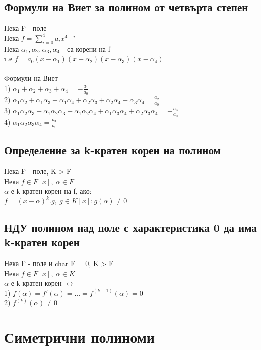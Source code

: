 \documentclass[12pt]{article}
\begin{document}
\subsection{Формули на Виет за полином от четвърта степен}
Нека F - поле \\
Нека $f = \sum\limits_{i=0}^{4}a_ix^{4-i}$ \\
Нека $\alpha_1 , \alpha_2 , \alpha_3 , \alpha_4$ - са корени на f \\
т.е $f = a_0(x-\alpha_1)(x-\alpha_2)(x-\alpha_3)(x-\alpha_4)$ \\\\
Формули на Виет\\
1) $\alpha_1 + \alpha_2 + \alpha_3 + \alpha_4 = -\frac{a_1}{a_0}$ \\
2) $\alpha_1\alpha_2 + \alpha_1\alpha_3 + \alpha_1\alpha_4 + \alpha_2\alpha_3 + \alpha_2\alpha_4 + \alpha_3\alpha_4 = \frac{a_2}{a_0}$\\
3) $\alpha_1\alpha_2\alpha_3 + \alpha_1\alpha_2\alpha_3 + \alpha_1\alpha_2\alpha_4 + \alpha_1\alpha_3\alpha_4 + \alpha_2\alpha_3\alpha_4 = -\frac{a_3}{a_0}$\\
4) $\alpha_1\alpha_2\alpha_3\alpha_4 = \frac{a_4}{a_0}$

\subsection{Определение за k-кратен корен на полином}
Нека F - поле, K > F \\
Нека $f \in F[x],\ \alpha \in F$  \\
$\alpha$ е k-кратен корен на f, ако:\\
$f = (x-\alpha)^k.g, \ g \in K[x] : g(\alpha) \neq 0$

\subsection{НДУ полином над поле с характеристика 0 да има k-кратен корен}
Нека F - поле и char F = 0, K > F \\
Нека $f \in F[x],\ \alpha \in K$\\
$\alpha$ е k-кратен корен $\leftrightarrow $\\
1) $f(\alpha) = f'(\alpha)=...=f^{(k-1)}(\alpha) = 0$ \\
2) $f^{(k)}(\alpha) \neq 0$

\section{Симетрични полиноми}
\end{document}

